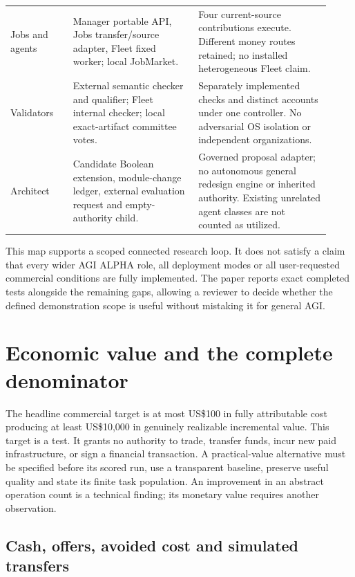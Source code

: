 \documentclass[11pt]{article}
\begin{document}
\begin{longtable}{P{0.18\linewidth}P{0.36\linewidth}P{0.38\linewidth}}
Jobs and agents & Manager portable API, Jobs transfer/source adapter, Fleet fixed worker; local JobMarket. & Four current-source contributions execute. Different money routes retained; no installed heterogeneous Fleet claim.\\
Validators & External semantic checker and qualifier; Fleet internal checker; local exact-artifact committee votes. & Separately implemented checks and distinct accounts under one controller. No adversarial OS isolation or independent organizations.\\
Architect & Candidate Boolean extension, module-change ledger, external evaluation request and empty-authority child. & Governed proposal adapter; no autonomous general redesign engine or inherited authority. Existing unrelated agent classes are not counted as utilized.\\
\bottomrule
\end{longtable}

This map supports a scoped connected research loop. It does not satisfy a claim that every wider AGI ALPHA role, all deployment modes or all user-requested commercial conditions are fully implemented. The paper reports exact completed tests alongside the remaining gaps, allowing a reviewer to decide whether the defined demonstration scope is useful without mistaking it for general AGI.



\section{Economic value and the complete denominator}

The headline commercial target is at most US\$100 in fully attributable cost producing at least US\$10,000 in genuinely realizable incremental value. This target is a test. It grants no authority to trade, transfer funds, incur new paid infrastructure, or sign a financial transaction. A practical-value alternative must be specified before its scored run, use a transparent baseline, preserve useful quality and state its finite task population. An improvement in an abstract operation count is a technical finding; its monetary value requires another observation.

\subsection{Cash, offers, avoided cost and simulated transfers}
\end{document}
